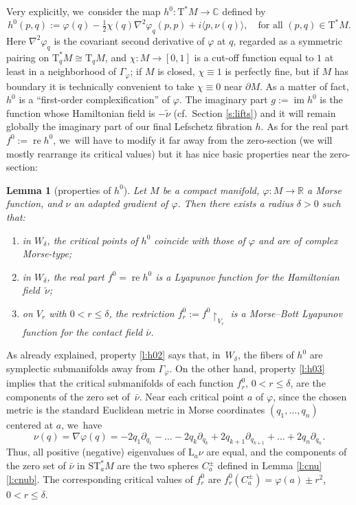 \documentclass[JEP,XML,SOM,Unicode]{cedram}
\newcommand{\C}{{\mathbb C}}
\newcommand{\R}{{\mathbb R}}
\newcommand{\Crit}{\Gamma_{\!\varphi}}
\newcommand{\re}{\operatorname{re}}
\newcommand{\im}{\operatorname{im}}
\newcommand{\etc}{,\ldots,}
\newcommand{\tu}[1]{\textup{#1}}
\newcommand{\sT}{\mathrm{T}^\ast}
\newcommand{\sST}{\mathrm{ST}^\ast}
\newcommand{\rT}{\mathrm{T}}
\newcommand{\hnu}{\tilde\nu}
\newcommand{\cnu}{\bar\nu}
\def\Lnu_#1{{\mathrm L_#1\nu}}
\newcommand{\prg}[1]{\langle #1 \rangle}
\newcommand{\de}{\mathrel{:=}}
\newcommand{\rst}[1]{{\upharpoonright}_{\!#1}}
\let\del\partial
\let\on\colon
\theoremstyle{plain}
\newtheorem{lemma}[theorem]{Lemma}
\theoremstyle{definition}
\begin{document}
Very explicitly, we~consider the map $h^0 \on \sT M \to \C$ defined by
\[
h^0(p,q) \de \varphi(q) - \tfrac12 \chi(q) \nabla^2\varphi_q (p,p)
	+ i \prg{p, \nu(q)}, \quad \text{for all $(p,q) \in \sT M$.}
\]
Here $\nabla^2\varphi_q$ is the covariant second derivative of $\varphi$ at $q$,
regarded as a symmetric pairing on $\sT_qM \cong \rT_qM$, and $\chi \on M \to
[0,1]$ is a cut-off function equal to $1$ at least in a neighborhood of $\Crit$;
if $M$ is closed, $\chi \equiv 1$ is perfectly fine, but if $M$ has boundary it
is technically convenient to take $\chi \equiv 0$ near $\del M$. As a matter of
fact, $h^0$ is a ``first-order complexification'' of $\varphi$. The imaginary
part $g \de \im h^0$ is the function whose Hamiltonian field is $-\hnu$ (cf.\
Section \ref{s:lifts}) and it will remain globally the imaginary part of our
final Lefschetz fibration $h$. As for the real part $f^0 \de \re h^0$, we~will
have to modify it far away from the zero-section (we will mostly rearrange its
critical values) but it has nice basic properties near the zero-section:

\begin{lemma}[properties of $h^0$] \label{l:h0}
Let $M$ be a compact manifold, $\varphi \on M \to \R$ a Morse function, and
$\nu$ an adapted gradient of $\varphi$. Then there exists a radius $\delta>0$
such that\tu:
\begin{enumerate}
\item\label{l:h01}
in $W_\delta$, the critical points of $h^0$ coincide with those of $\varphi$ and
are of complex Morse-type\tu;
\item\label{l:h02}
in $W_\delta$, the real part $f^0 = \re h^0$ is a Lyapunov function for the
Hamiltonian field~$\hnu$\tu;
\item\label{l:h03}
on $V_r$ with $0 < r \le \delta$, the restriction $f_r^0 \de f^0 \rst{ V_r }$ is
a Morse--Bott Lyapunov function for the contact field $\cnu$.
\end{enumerate}
\end{lemma}

As already explained, property \eqref{l:h02} says that, in~$W_\delta$, the fibers of $h^0$
are symplectic submanifolds away from $\Crit$. On the other hand, property \eqref{l:h03}
implies that the critical submanifolds of each function $f_r^0$, $0 < r \le
\delta$, are the components of the zero set of~$\cnu$. Near each critical point
$a$ of $\varphi$, since the chosen metric is the standard Euclidean metric in
Morse coordinates $(q_1 \etc q_n)$ centered at $a$, we~have
\[
\nu(q) = \nabla\varphi(q) = - 2q_1 \del_{q_1} -\dots- 2q_k \del_{q_k}
	+ 2q_{k+1} \del_{q_{k+1}} +\dots+ 2q_n \del_{q_n}.
\]
Thus, all positive (\resp negative) eigenvalues of $\Lnu_a$ are equal, and the
components of the zero set of $\cnu$ in $\sST_aM$ are the two spheres $C_a^\pm$
defined in Lemma \ref{l:cnu}\eqref{l:cnub}. The corresponding critical values of $f_r^0$ are
$f_r^0(C_a^\pm) = \varphi(a) \pm r^2$, $0 < r \le \delta$.
\end{document}
